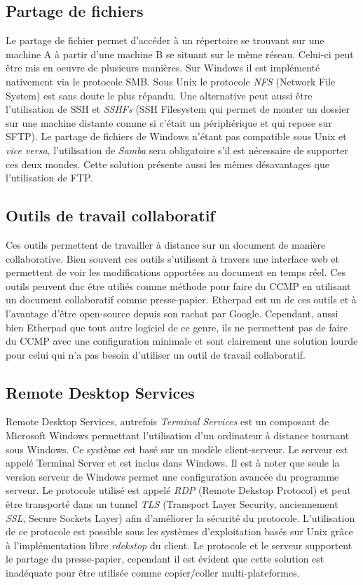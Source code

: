 \subsection{Partage de fichiers}
Le partage de fichier permet d'accéder à un répertoire se trouvant sur
une machine A à partir d'une machine B se situant sur le même réseau.
Celui-ci peut être mis en oeuvre de plusieurs manières. Sur Windows
il est implémenté nativement via le protocole SMB. Sous Unix le protocole
\emph{NFS} (Network File System) est sans doute le plus répandu.
Une alternative peut aussi être l'utilisation de SSH et \emph{SSHFs}
(SSH Filesystem qui permet de monter un dossier sur une machine distante
comme si c'était un périphérique et qui repose sur SFTP). Le partage de
fichiers de Windows n'étant pas compatible sous Unix et \emph{vice versa},
l'utilisation de \emph{Samba} \cite{samba} sera obligatoire s'il est nécessaire
de supporter ces deux mondes. Cette solution présente aussi les mêmes
désavantages que l'utilisation de FTP.

\subsection{Outils de travail collaboratif}
Ces outils permettent de travailler à distance sur un document de manière
collaborative. Bien souvent ces outils s'utilisent à travers une interface
web et permettent de voir les modifications apportées au document en temps
réel. Ces outils peuvent dnc être utiliés comme méthode pour faire du CCMP
en utilisant un document collaboratif comme presse-papier.
Etherpad\cite{etherpad} est un de ces outils et à l'avantage d'être
open-source depuis son rachat par Google.
Cependant, aussi bien Etherpad que tout autre logiciel de ce genre, ils ne
permettent pas de faire du CCMP avec une configuration minimale et sont
clairement une solution lourde pour celui qui n'a pas besoin d'utiliser un
outil de travail collaboratif.

\subsection{Remote Desktop Services}
Remote Desktop Services, autrefois \emph{Terminal Services}
est un composant de Microsoft Windows permettant l'utilisation
d'un ordinateur à distance tournant sous Windows\cite{wiki:rds}.
Ce système est basé sur un modèle client-serveur.
Le serveur est appelé Terminal Server et est inclus dans Windows.
Il est à noter que seule la version serveur
de Windows permet une configuration avancée du programme serveur.
Le protocole utilisé est appelé \emph{RDP} (Remote Dekstop Protocol) et
peut être transporté dans un tunnel \emph{TLS} (Transport Layer Security,
anciennement \emph{SSL}, Secure Sockets Layer) afin d'améliorer la sécurité
du protocole. L'utilisation de ce protocole est possible sous les
systèmes d'exploitation basés sur Unix grâce à l'implémentation
libre \emph{rdekstop} \cite{rdesktop} du client. Le protocole et le serveur
supportent le partage du presse-papier, cependant il est évident que cette
solution est inadéquate pour être utilisée comme copier/coller
multi-plateformes.

